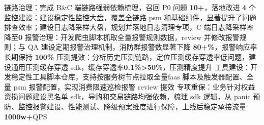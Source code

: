 \documentclass[11pt,a4paper]{moderncv}
\begin{document}
{\begin{itemize}
        \newline 链路治理：完成 B\&C 端链路强弱依赖梳理，召回 P0 问题 \textbf{10+}，落地改进 \textbf{4} 个
        \newline 监控建设：建设稳定性监控大盘，覆盖全链路 psm 和基础组件，显著提升了问题排查效率；建设日志降采样大盘，规划并落地日志清理专项，C 端日志降采样率降至\textbf{0}
        \newline 报警治理：开发爬虫脚本抓取全量报警规则数据，review 并修改报警规则；与 QA 建设定期报警治理机制，消防群报警数显著下降 \textbf{80+\%}，报警响应率长期保持 \textbf{100\%}
        \newline 压测提效：分析历史压测链路，定位压测缓存穿透率低问题，建设通用压测缓存穿透 sdk，缓存穿透率\textbf{0.1\%\->50\%}，压测精度提升
        \newline 工具建设：开发稳定性工具脚本仓库，支持按服务树节点拉取全量faas 脚本及触发器配置、全量 psm 报警配置，实现消费限速巡检报警 review 提效
        \newline 专项重保：业务针对权益资损问题建设黑名单 sdk，导购和交易链路均强依赖，梳理 sdk 逻辑，从 panic 预防、监控报警建设、性能测试、降级预案维度进行保障，上线后稳定承接流量\textbf{1000w+}QPS
    \end{itemize}}
\end{document}
